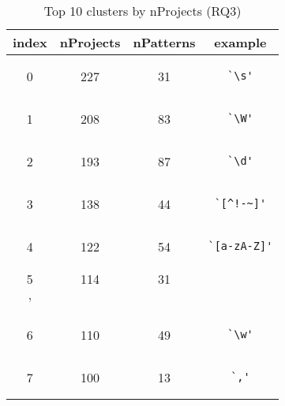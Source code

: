 
\begin{table}
\begin{center}
\caption{Top 10 clusters by nProjects (RQ3)}
\label{table:topNClusters}

\begin{tabular}
{cccc}
index & nProjects & nPatterns & example\\
\toprule
0 & 227 & 31 & \begin{minipage}{0.5in}\begin{verbatim}`\s'\end{verbatim}\end{minipage}\\
\midrule
1 & 208 & 83 & \begin{minipage}{0.5in}\begin{verbatim}`\W'\end{verbatim}\end{minipage}\\
\midrule
2 & 193 & 87 & \begin{minipage}{0.5in}\begin{verbatim}`\d'\end{verbatim}\end{minipage}\\
\midrule
3 & 138 & 44 & \begin{minipage}{0.5in}\begin{verbatim}`[^!-~]'\end{verbatim}\end{minipage}\\
\midrule
4 & 122 & 54 & \begin{minipage}{0.5in}\begin{verbatim}`[a-zA-Z]'\end{verbatim}\end{minipage}\\
\midrule
5 & 114 & 31 & \begin{minipage}{0.5in}\begin{verbatim}`\\'\end{verbatim}\end{minipage}\\
\midrule
6 & 110 & 49 & \begin{minipage}{0.5in}\begin{verbatim}`\w'\end{verbatim}\end{minipage}\\
\midrule
7 & 100 & 13 & \begin{minipage}{0.5in}\begin{verbatim}`,'\end{verbatim}\end{minipage}\\

\end{tabular}
\end{center}
\end{table}
